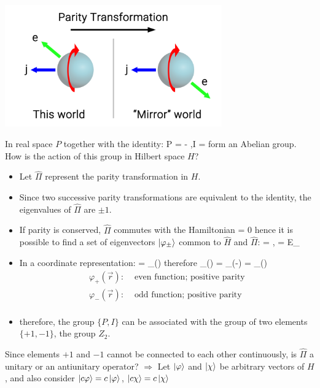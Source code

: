 \documentclass[12pt]{article}
\begin{document}
\begin{center}
\includegraphics[width=0.7\textwidth]{Figures/Parity_transformation.png}
\end{center}

In real space $P$ together with the identity:
\be
P = - ,\quad I = 
\ee
form an Abelian group. How is the action of this
group in Hilbert space $H$?
\begin{itemize}
\item Let $\hat{\Pi}$ represent the parity transformation in $H$.
%
\item Since two successive parity transformations
are equivalent to the identity, the eigenvalues
of $\hat{\Pi}$ are $\pm1$.
%
\item If parity is conserved, $\hat{\Pi}$ commutes with
the Hamiltonian
 = 0
\ee
hence it is possible to find a set of eigenvectors
$\ket{\varphi_\pm}$ common to $\hat{H}$ and $\hat{\Pi}$:
\be
\hat{\Pi}\ket{\varphi_\pm} = \pm\ket{\varphi_\pm},\quad
{}\ket{\varphi_\pm} = E_\pm \ket{\varphi_\pm}
\ee
%
\item In a coordinate representation:
\be
{}\ket{\varphi_\pm} = \varphi_\pm()
\ee
therefore
\be
\hat{\Pi} \varphi_\pm() =  \varphi_\pm(-) = \pm \varphi_\pm()
\ee
\[
\begin{aligned}
\varphi_+(\vec{r}):& \text{ even function; positive parity}\\
\varphi_-(\vec{r}):& \text{ odd function; positive parity}\\
\end{aligned}
\]
\item therefore, the group $\{P,I\}$ can be associated
with the group of two elements $\{+1,-1\}$, the
group $Z_2$.
\end{itemize}

Since elements $+1$ and $-1$ cannot be connected
to each other continuously, is $\hat{\Pi}$ a unitary or
an antiunitary operator? $\Rightarrow$
Let $\ket{\varphi}$ and $\ket{\chi}$ be arbitrary vectors of $H$,
and also consider $\ket{c\varphi} = c\ket{\varphi}$, $\ket{c\chi} = c\ket{\chi}$
\end{document}
